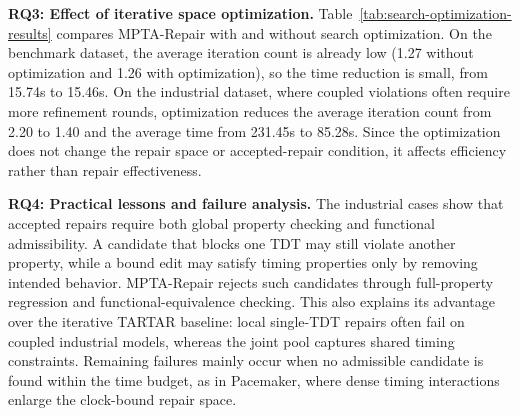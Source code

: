 

\noindent\textbf{RQ3: Effect of iterative space optimization.}
Table~\ref{tab:search-optimization-results} compares MPTA-Repair with
and without search optimization. On the benchmark dataset, the average
iteration count is already low (1.27 without optimization and 1.26 with
optimization), so the time reduction is small, from 15.74s to 15.46s.
On the industrial dataset, where coupled violations often require more
refinement rounds, optimization reduces the average iteration count from
2.20 to 1.40 and the average time from 231.45s to 85.28s. Since the
optimization does not change the repair space or accepted-repair
condition, it affects efficiency rather than repair effectiveness.

\noindent\textbf{RQ4: Practical lessons and failure analysis.}
The industrial cases show that accepted repairs require both global
property checking and functional admissibility. A candidate that blocks
one TDT may still violate another property, while a bound edit may
satisfy timing properties only by removing intended behavior.
MPTA-Repair rejects such candidates through full-property regression and
functional-equivalence checking. This also explains its advantage over
the iterative TARTAR baseline: local single-TDT repairs often fail
on coupled industrial models, whereas the joint pool captures shared
timing constraints. Remaining failures mainly occur when no admissible
candidate is found within the time budget, as in Pacemaker, where dense
timing interactions enlarge the clock-bound repair space.
